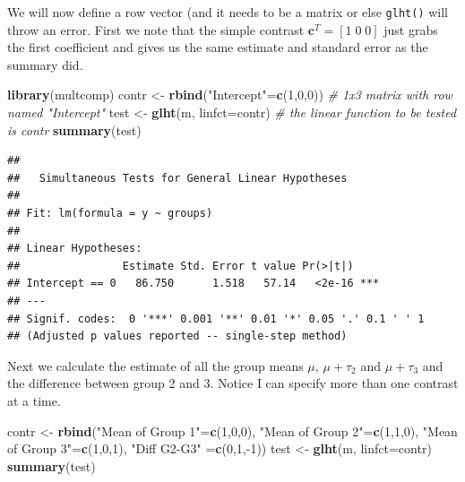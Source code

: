 \documentclass[]{book}
\newenvironment{Shaded}{\begin{snugshade}}{\end{snugshade}}
\newcommand{\KeywordTok}[1]{\textcolor[rgb]{0.13,0.29,0.53}{\textbf{{#1}}}}
\newcommand{\DataTypeTok}[1]{\textcolor[rgb]{0.13,0.29,0.53}{{#1}}}
\newcommand{\DecValTok}[1]{\textcolor[rgb]{0.00,0.00,0.81}{{#1}}}
\newcommand{\StringTok}[1]{\textcolor[rgb]{0.31,0.60,0.02}{{#1}}}
\newcommand{\CommentTok}[1]{\textcolor[rgb]{0.56,0.35,0.01}{\textit{{#1}}}}
\newcommand{\NormalTok}[1]{{#1}}
\theoremstyle{definition}
\theoremstyle{definition}
\theoremstyle{remark}
\begin{document}
We will now define a row vector (and it needs to be a matrix or else
\texttt{glht()} will throw an error. First we note that the simple
contrast \(\boldsymbol{c}^{T}=\left[1\;0\;0\right]\) just grabs the
first coefficient and gives us the same estimate and standard error as
the summary did.

\begin{Shaded}
\begin{Highlighting}[]
\KeywordTok{library}\NormalTok{(multcomp)}
\NormalTok{contr <-}\StringTok{ }\KeywordTok{rbind}\NormalTok{(}\StringTok{"Intercept"}\NormalTok{=}\KeywordTok{c}\NormalTok{(}\DecValTok{1}\NormalTok{,}\DecValTok{0}\NormalTok{,}\DecValTok{0}\NormalTok{)) }\CommentTok{# 1x3 matrix with row named "Intercept"}
\NormalTok{test <-}\StringTok{ }\KeywordTok{glht}\NormalTok{(m, }\DataTypeTok{linfct=}\NormalTok{contr)        }\CommentTok{# the linear function to be tested is contr}
\KeywordTok{summary}\NormalTok{(test)}
\end{Highlighting}
\end{Shaded}

\begin{verbatim}
## 
##   Simultaneous Tests for General Linear Hypotheses
## 
## Fit: lm(formula = y ~ groups)
## 
## Linear Hypotheses:
##                Estimate Std. Error t value Pr(>|t|)    
## Intercept == 0   86.750      1.518   57.14   <2e-16 ***
## ---
## Signif. codes:  0 '***' 0.001 '**' 0.01 '*' 0.05 '.' 0.1 ' ' 1
## (Adjusted p values reported -- single-step method)
\end{verbatim}

Next we calculate the estimate of all the group means \(\mu\),
\(\mu+\tau_{2}\) and \(\mu+\tau_{3}\) and the difference between group 2
and 3. Notice I can specify more than one contrast at a time.

\begin{Shaded}
\begin{Highlighting}[]
\NormalTok{contr <-}\StringTok{ }\KeywordTok{rbind}\NormalTok{(}\StringTok{"Mean of Group 1"}\NormalTok{=}\KeywordTok{c}\NormalTok{(}\DecValTok{1}\NormalTok{,}\DecValTok{0}\NormalTok{,}\DecValTok{0}\NormalTok{),}
               \StringTok{"Mean of Group 2"}\NormalTok{=}\KeywordTok{c}\NormalTok{(}\DecValTok{1}\NormalTok{,}\DecValTok{1}\NormalTok{,}\DecValTok{0}\NormalTok{),}
               \StringTok{"Mean of Group 3"}\NormalTok{=}\KeywordTok{c}\NormalTok{(}\DecValTok{1}\NormalTok{,}\DecValTok{0}\NormalTok{,}\DecValTok{1}\NormalTok{),}
               \StringTok{"Diff G2-G3"}     \NormalTok{=}\KeywordTok{c}\NormalTok{(}\DecValTok{0}\NormalTok{,}\DecValTok{1}\NormalTok{,-}\DecValTok{1}\NormalTok{)) }
\NormalTok{test <-}\StringTok{ }\KeywordTok{glht}\NormalTok{(m, }\DataTypeTok{linfct=}\NormalTok{contr)}
\KeywordTok{summary}\NormalTok{(test)}
\end{Highlighting}
\end{Shaded}
\end{document}
